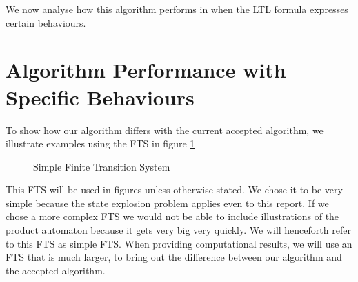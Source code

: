 We now analyse how this algorithm performs in when the LTL formula expresses certain behaviours. 

\section{Algorithm Performance with Specific Behaviours}
To show how our algorithm differs with the current accepted algorithm, we illustrate examples using the FTS in figure \ref{fig:ftsEx}

\begin{figure}
\caption{Simple Finite Transition System}
\label{fig:ftsEx}
\end{figure}
This FTS will be used in figures unless otherwise stated. We chose it to be very simple because the state explosion problem applies even to this report. If we chose a more complex FTS we would not be able to include illustrations of the product automaton because it gets very big very quickly. We will henceforth refer to this FTS as simple FTS. When providing computational results, we will use an FTS that is much larger, to bring out the difference between our algorithm and the accepted algorithm.


